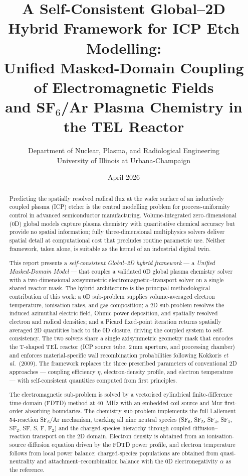 \documentclass[11pt,a4paper]{report}
\title{A Self-Consistent Global–2D Hybrid Framework for ICP Etch Modelling:\\[6pt]
\large Unified Masked-Domain Coupling of Electromagnetic Fields\\
and SF$_6$/Ar Plasma Chemistry in the TEL Reactor}
\author{Department of Nuclear, Plasma, and Radiological Engineering\\
University of Illinois at Urbana-Champaign}
\date{April 2026}
\begin{document}
\maketitle

\begin{abstract}
Predicting the spatially resolved radical flux at the wafer surface of an inductively coupled plasma (ICP) etcher is the central modelling problem for process-uniformity control in advanced semiconductor manufacturing. Volume-integrated zero-dimensional (0D) global models capture plasma chemistry with quantitative chemical accuracy but provide no spatial information; fully three-dimensional multiphysics solvers deliver spatial detail at computational cost that precludes routine parametric use. Neither framework, taken alone, is suitable as the kernel of an industrial digital twin.

This report presents a \emph{self-consistent Global--2D hybrid framework} --- a \emph{Unified Masked-Domain Model} --- that couples a validated 0D global plasma chemistry solver with a two-dimensional axisymmetric electromagnetic--transport solver on a single shared reactor mask. The hybrid architecture is the principal methodological contribution of this work: a 0D sub-problem supplies volume-averaged electron temperature, ionisation rates, and gas composition; a 2D sub-problem resolves the induced azimuthal electric field, Ohmic power deposition, and spatially resolved electron and radical densities; and a Picard fixed-point iteration returns spatially averaged 2D quantities back to the 0D closure, driving the coupled system to self-consistency. The two solvers share a single axisymmetric geometry mask that encodes the T-shaped TEL reactor (ICP source tube, 2\,mm aperture, and processing chamber) and enforces material-specific wall recombination probabilities following Kokkoris \textit{et al.}\ (2009). The framework replaces the three prescribed parameters of conventional 2D approaches --- coupling efficiency $\eta$, electron-density profile, and electron temperature --- with self-consistent quantities computed from first principles.

The electromagnetic sub-problem is solved by a vectorised cylindrical finite-difference time-domain (FDTD) method at \SI{40}{\mega\hertz} with an embedded coil source and Mur first-order absorbing boundaries. The chemistry sub-problem implements the full Lallement 54-reaction SF$_6$/Ar mechanism, tracking all nine neutral species (SF$_6$, SF$_5$, SF$_4$, SF$_3$, SF$_2$, SF, S, F, F$_2$) and the charged-species hierarchy through coupled diffusion--reaction transport on the 2D domain. Electron density is obtained from an ionisation-source diffusion equation driven by the FDTD power profile, and electron temperature follows from local power balance; charged-species populations are obtained from quasi-neutrality and attachment--recombination balance with the 0D electronegativity $\alpha$ as the reference.


\end{abstract}
\end{document}
